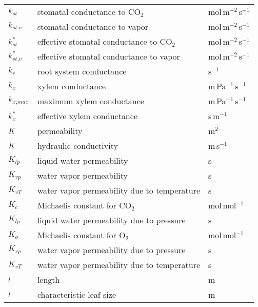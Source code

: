 \begin{longtable}{p{}p{}p{}}
	$k_{\textit{st}}$ & stomatal conductance to CO$_2$ & mol\,m$^{-2}$\,s$^{-1}$  \\ 	
	$k_{\textit{st,v}}$ & stomatal conductance to vapor & mol\,m$^{-2}$\,s$^{-1}$  \\ 		
	$k_{\textit{st}}^*$ & effective stomatal conductance to CO$_2$ & mol\,m$^{-2}$\,s$^{-1}$  \\ 		
	$k_{\textit{st,v}}^*$ & effective stomatal conductance to vapor & mol\,m$^{-2}$\,s$^{-1}$  \\ 			
	$k_r$ & root system conductance & s$^{-1}$  \\ 				
	$k_x$ & xylem conductance & m\,Pa$^{-1}$\,s$^{-1}$  \\ 					
	$k_{\textit{x,max}}$ & maximum xylem conductance & m\,Pa$^{-1}$\,s$^{-1}$  \\ 						
	$k_x^*$ & effective xylem conductance & s\,m$^{-1}$  \\ 						
	$K$ & permeability & m$^2$  \\ 
	$K$ & hydraulic conductivity & m\,s$^{-1}$  \\ 	
	$K_{\textit{lp}}$ & liquid water permeability & s \\ 	
	$K_{\textit{vp}}$ & water vapor permeability & s \\ 		
	$K_{\textit{vT}}$ & water vapor permeability due to temperature & s \\ 			
	$K_c$ & Michaelis constant for CO$_2$ & mol\,mol$^{-1}$ \\ 	
	$K_{\textit{lp}}$ & liquid water permeability due to pressure & s \\ 		
	$K_o$ & Michaelis constant for O$_2$ & mol\,mol$^{-1}$ \\ 	
	$K_{\textit{vp}}$ & water vapor permeability due to pressure & s \\ 				
	$K_{\textit{vT}}$ & water vapor permeability due to temperature & s \\ 					
	$l$ & length & m \\ 
	$l$ & characteristic leaf size & m \\ 	


\end{longtable}
